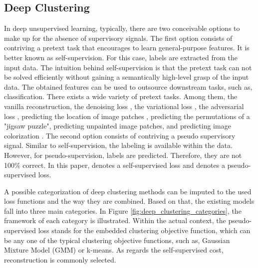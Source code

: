 \documentclass{article}
\begin{document}
\subsection{Deep Clustering}
In deep unsupervised learning, typically, there are two conceivable options to make up for the absence of supervisory signals. The first option consists of contriving a pretext task that encourages to learn general-purpose features. It is better known as self-supervision. For this case, labels are extracted from the input data. The intuition behind self-supervision is that the pretext task can not be solved efficiently without gaining a semantically high-level grasp of the input data. The obtained features can be used to outsource downstream tasks, such as, classification. There exists a wide variety of pretext tasks. Among them, the vanilla reconstruction, the denoising loss \cite{paper58}, the variational loss \cite{paper64}, the adversarial loss \cite{paper1}, predicting the location of image patches \cite{paper59}, predicting the permutations of a "jigsaw puzzle"\cite{paper61}, predicting unpainted image patches\cite{paper62}, and predicting image colorization \cite{paper63}. The second option consists of contriving a pseudo supervisory signal. Similar to self-supervision, the labeling is available within the data. However, for pseudo-supervision, labels are predicted. Therefore, they are not 100\% correct. In this paper,  denotes a self-supervised loss and  denotes a pseudo-supervised loss. 

A possible categorization of deep clustering methods can be imputed to the used loss functions and the way they are combined. Based on that, the existing models fall into three main categories. In Figure \ref{fig:deep_clustering_categories}, the framework of each category is illustrated. Within the actual context, the pseudo-supervised loss stands for the embedded clustering objective function, which can be any one of the typical clustering objective functions, such as, Gaussian Mixture Model (GMM) or k-means. As regards the self-supervised cost, reconstruction is commonly selected.
\end{document}
